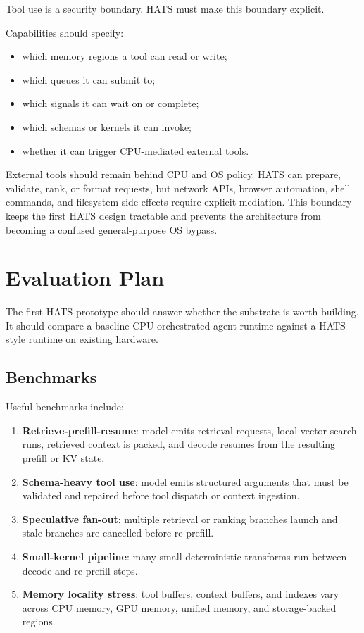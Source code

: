 \documentclass[11pt]{article}
\begin{document}
Tool use is a security boundary. HATS must make this boundary explicit.

Capabilities should specify:

\begin{itemize}[leftmargin=*]
  \item which memory regions a tool can read or write;
  \item which queues it can submit to;
  \item which signals it can wait on or complete;
  \item which schemas or kernels it can invoke;
  \item whether it can trigger CPU-mediated external tools.
\end{itemize}

External tools should remain behind CPU and OS policy. HATS can prepare,
validate, rank, or format requests, but network APIs, browser automation, shell
commands, and filesystem side effects require explicit mediation. This boundary
keeps the first HATS design tractable and prevents the architecture from
becoming a confused general-purpose OS bypass.

\section{Evaluation Plan}

The first HATS prototype should answer whether the substrate is worth building.
It should compare a baseline CPU-orchestrated agent runtime against a HATS-style
runtime on existing hardware.

\subsection{Benchmarks}

Useful benchmarks include:

\begin{enumerate}[leftmargin=*]
  \item \textbf{Retrieve-prefill-resume}: model emits retrieval requests, local
        vector search runs, retrieved context is packed, and decode resumes
        from the resulting prefill or KV state.
  \item \textbf{Schema-heavy tool use}: model emits structured arguments that
        must be validated and repaired before tool dispatch or context
        ingestion.
  \item \textbf{Speculative fan-out}: multiple retrieval or ranking branches
        launch and stale branches are cancelled before re-prefill.
  \item \textbf{Small-kernel pipeline}: many small deterministic transforms run
        between decode and re-prefill steps.
  \item \textbf{Memory locality stress}: tool buffers, context buffers, and
        indexes vary across CPU memory, GPU memory, unified memory, and
        storage-backed regions.
\end{enumerate}
\end{document}

